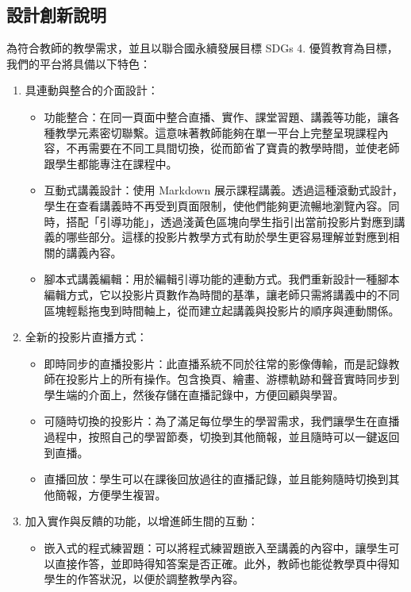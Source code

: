 \documentclass[12pt]{article}
\begin{document}
\subsection{設計創新說明}
為符合教師的教學需求，並且以聯合國永續發展目標 SDGs 4. 優質教育為目標，我們的平台將具備以下特色：
\begin{enumerate}[label=(\arabic*)]
  \item 具連動與整合的介面設計：
  \begin{itemize}
    \item 功能整合：在同一頁面中整合直播、實作、課堂習題、講義等功能，讓各種教學元素密切聯繫。這意味著教師能夠在單一平台上完整呈現課程內容，不再需要在不同工具間切換，從而節省了寶貴的教學時間，並使老師跟學生都能專注在課程中。
    \item 互動式講義設計：使用 Markdown 展示課程講義。透過這種滾動式設計，學生在查看講義時不再受到頁面限制，使他們能夠更流暢地瀏覽內容。同時，搭配「引導功能」，透過淺黃色區塊向學生指引出當前投影片對應到講義的哪些部分。這樣的投影片教學方式有助於學生更容易理解並對應到相關的講義內容。\
    \item 腳本式講義編輯：用於編輯引導功能的連動方式。我們重新設計一種腳本編輯方式，它以投影片頁數作為時間的基準，讓老師只需將講義中的不同區塊輕鬆拖曳到時間軸上，從而建立起講義與投影片的順序與連動關係。
  \end{itemize}
  \item 全新的投影片直播方式：
  \begin{itemize}
    \item 即時同步的直播投影片：此直播系統不同於往常的影像傳輸，而是記錄教師在投影片上的所有操作。包含換頁、繪畫、游標軌跡和聲音實時同步到學生端的介面上，然後存儲在直播記錄中，方便回顧與學習。
    \item 可隨時切換的投影片：為了滿足每位學生的學習需求，我們讓學生在直播過程中，按照自己的學習節奏，切換到其他簡報，並且隨時可以一鍵返回到直播。
    \item 直播回放：學生可以在課後回放過往的直播記錄，並且能夠隨時切換到其他簡報，方便學生複習。
  \end{itemize}
  \item 加入實作與反饋的功能，以增進師生間的互動：
  \begin{itemize}
    \item 嵌入式的程式練習題：可以將程式練習題嵌入至講義的內容中，讓學生可以直接作答，並即時得知答案是否正確。此外，教師也能從教學頁中得知學生的作答狀況，以便於調整教學內容。
      

\end{itemize}
\end{enumerate}
\end{document}

